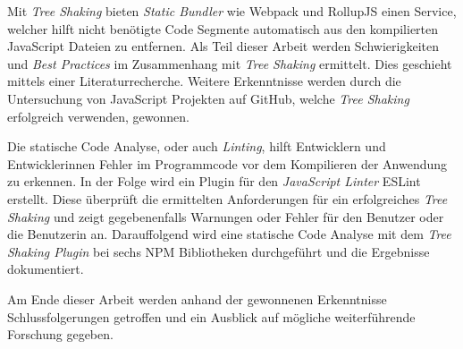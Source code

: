 Mit \textit{Tree Shaking} bieten \textit{Static Bundler} wie Webpack und RollupJS einen Service, welcher hilft nicht benötigte Code Segmente automatisch aus den kompilierten JavaScript Dateien zu entfernen. Als Teil dieser Arbeit werden Schwierigkeiten und \textit{Best Practices} im Zusammenhang mit \textit{Tree Shaking} ermittelt. Dies geschieht mittels einer Literaturrecherche. Weitere Erkenntnisse werden durch die Untersuchung von JavaScript Projekten auf GitHub, welche \textit{Tree Shaking} erfolgreich verwenden, gewonnen.

Die statische Code Analyse, oder auch \textit{Linting}, hilft Entwicklern und Entwicklerinnen Fehler im Programmcode vor dem Kompilieren der Anwendung zu erkennen. In der Folge wird ein Plugin für den \textit{JavaScript Linter} ESLint erstellt. Diese überprüft die ermittelten Anforderungen für ein erfolgreiches \textit{Tree Shaking} und zeigt gegebenenfalls Warnungen oder Fehler für den Benutzer oder die Benutzerin an. Darauffolgend wird eine statische Code Analyse mit dem \textit{Tree Shaking Plugin} bei sechs NPM Bibliotheken durchgeführt und die Ergebnisse dokumentiert.

Am Ende dieser Arbeit werden anhand der gewonnenen Erkenntnisse Schlussfolgerungen getroffen und ein Ausblick auf mögliche weiterführende Forschung gegeben.